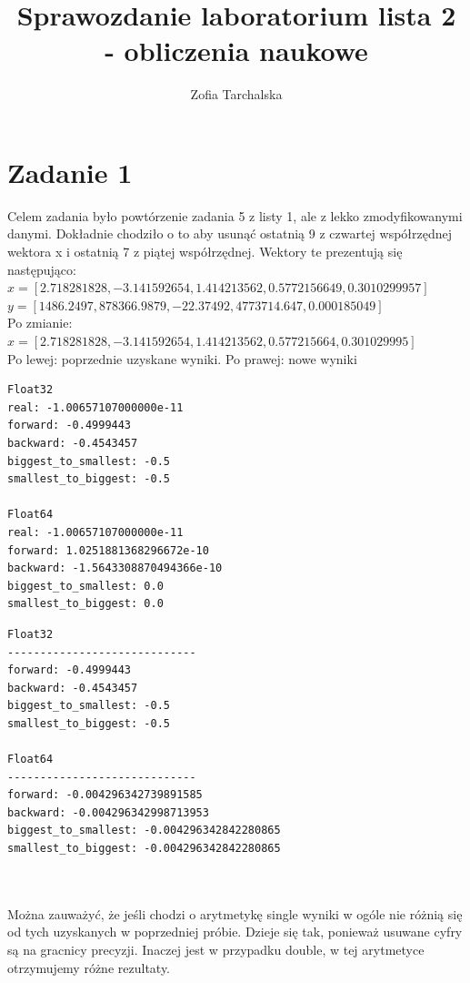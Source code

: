 \documentclass{article}
\title{Sprawozdanie laboratorium lista 2 - obliczenia naukowe}
\author{\normalsize Zofia Tarchalska}
\date{}
\begin{document}
\maketitle


\section{Zadanie 1}
Celem zadania było powtórzenie zadania 5 z listy 1, ale z lekko zmodyfikowanymi danymi. Dokładnie chodziło o to aby usunąć ostatnią 9 z czwartej współrzędnej wektora x i ostatnią 7 z piątej współrzędnej. Wektory te prezentują się następująco:\\
\noindent $x = [2.718281828, -3.141592654, 1.414213562, 0.5772156649, 0.3010299957]$\\
\noindent $y = [1486.2497, 878366.9879, -22.37492, 4773714.647, 0.000185049]$\\

\noindent Po zmianie:\\
$x = [2.718281828, -3.141592654, 1.414213562, 0.577215664, 0.301029995]$\\

\noindent Po lewej: poprzednie uzyskane wyniki. Po prawej: nowe wyniki\\

\noindent
\begin{minipage}{0.48\textwidth}
\begin{verbatim}
Float32
real: -1.00657107000000e-11
forward: -0.4999443
backward: -0.4543457
biggest_to_smallest: -0.5
smallest_to_biggest: -0.5

Float64
real: -1.00657107000000e-11
forward: 1.0251881368296672e-10
backward: -1.5643308870494366e-10
biggest_to_smallest: 0.0
smallest_to_biggest: 0.0
\end{verbatim}
\end{minipage}
\hfill
\begin{minipage}{0.48\textwidth}
\begin{verbatim}
Float32
-----------------------------
forward: -0.4999443
backward: -0.4543457
biggest_to_smallest: -0.5
smallest_to_biggest: -0.5

Float64
-----------------------------
forward: -0.004296342739891585
backward: -0.004296342998713953
biggest_to_smallest: -0.004296342842280865
smallest_to_biggest: -0.004296342842280865
\end{verbatim}
\end{minipage}

\noindent \\\\Można zauważyć, że jeśli chodzi o arytmetykę single wyniki w ogóle nie różnią się od tych uzyskanych w poprzedniej próbie. Dzieje się tak, ponieważ usuwane cyfry są na gracnicy precyzji. Inaczej jest w przypadku double, w tej arytmetyce otrzymujemy różne rezultaty. 
\end{document}
